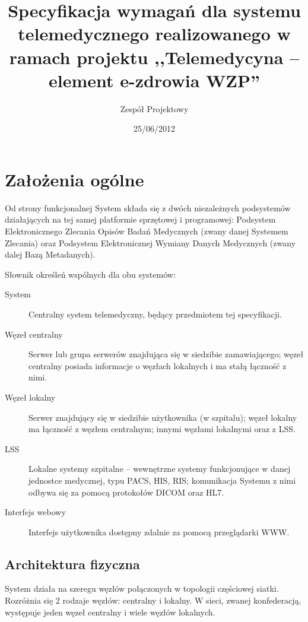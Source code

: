 \documentclass[a4paper]{report}
\begin{document}
\title{Specyfikacja wymagań dla systemu telemedycznego realizowanego w ramach projektu ,,Telemedycyna – element e-zdrowia WZP''}
\author{Zespół Projektowy}
\date{25/06/2012}
\maketitle

\tableofcontents

\chapter{Założenia ogólne}

Od strony funkcjonalnej System składa się z dwóch niezależnych podsystemów działających na tej samej platformie sprzętowej i programowej: Podsystem Elektronicznego Zlecania Opisów Badań Medycznych (zwany danej Systemem Zlecania) oraz Podsystem Elektronicznej Wymiany Danych Medycznych (zwany dalej Bazą Metadanych).

Słownik określeń wspólnych dla obu systemów:
\begin{description}
\item[System] Centralny system telemedyczny, będący przedmiotem tej specyfikacji.
\item[Węzeł centralny] Serwer lub grupa serwerów znajdująca się w siedzibie zamawiającego; węzeł centralny posiada informacje o węzłach lokalnych i ma stałą łączność z nimi.
\item[Węzeł lokalny] Serwer znajdujący się w siedzibie użytkownika (w szpitalu); węzeł lokalny ma łączność z węzłem centralnym; innymi węzłami lokalnymi oraz z LSS.
\item[LSS] Lokalne systemy szpitalne -- wewnętrzne systemy funkcjonujące w danej jednostce medycznej, typu PACS, HIS, RIS; komunikacja Systemu z nimi odbywa się za pomocą protokołów DICOM oraz HL7.
\item[Interfejs webowy] Interfejs użytkownika dostępny zdalnie za pomocą przeglądarki WWW.
\end{description}

\section{Architektura fizyczna}
\label{sec:arch_fiz}

System działa na szeregu węzłów połączonych w topologii częściowej siatki. Rozróżnia się 2 rodzaje węzłów: centralny i lokalny. W sieci, zwanej konfederacją, występuje jeden węzeł centralny i wiele węzłów lokalnych. 
\end{document}
